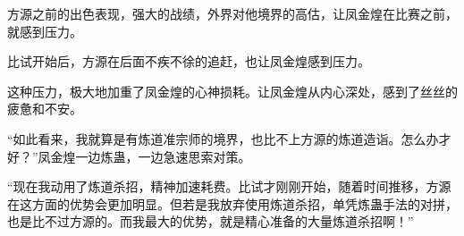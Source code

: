 \begin{this_body}
方源之前的出色表现，强大的战绩，外界对他境界的高估，让凤金煌在比赛之前，就感到压力。

比试开始后，方源在后面不疾不徐的追赶，也让凤金煌感到压力。

这种压力，极大地加重了凤金煌的心神损耗。让凤金煌从内心深处，感到了丝丝的疲惫和不安。

“如此看来，我就算是有炼道准宗师的境界，也比不上方源的炼道造诣。怎么办才好？”凤金煌一边炼蛊，一边急速思索对策。

“现在我动用了炼道杀招，精神加速耗费。比试才刚刚开始，随着时间推移，方源在这方面的优势会更加明显。但若是我放弃使用炼道杀招，单凭炼蛊手法的对拼，也是比不过方源的。而我最大的优势，就是精心准备的大量炼道杀招啊！”

\end{this_body}

